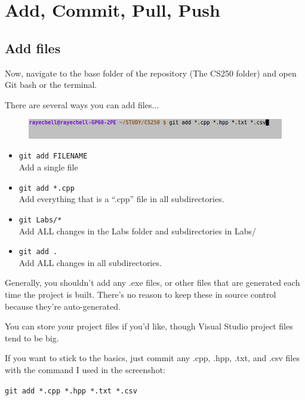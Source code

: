 \documentclass[a4paper,12pt,oneside]{book}
\begin{document}
    \section{Add, Commit, Pull, Push}

        \subsection{Add files}

        Now, navigate to the base folder of the repository (The CS250 folder)
        and open Git bash or the terminal.

        There are several ways you can add files...

        \begin{figure}[h]
            \centering
            \includegraphics[width=14cm]{images/git-add.png}
        \end{figure}

        \begin{itemize}
            \item   \texttt{git add FILENAME} \\ Add a single file
            \item   \texttt{git add *.cpp} \\ Add everything that is a ``.cpp'' file in all subdirectories.
            \item   \texttt{git Labs/*} \\ Add ALL changes in the Labs folder and subdirectories in Labs/
            \item   \texttt{git add .} \\ Add ALL changes in all subdirectories.
        \end{itemize}

        Generally, you shouldn't add any .exe files, or other files that are
        generated each time the project is built. There's no reason to keep these
        in source control because they're auto-generated.

        You can store your project files if you'd like, though Visual Studio
        project files tend to be big.

        If you want to stick to the basics, just commit any .cpp, .hpp, .txt,
        and .csv files with the command I used in the screenshot:

        \begin{center}
            \texttt{git add *.cpp *.hpp *.txt *.csv}
        \end{center}
\end{document}
